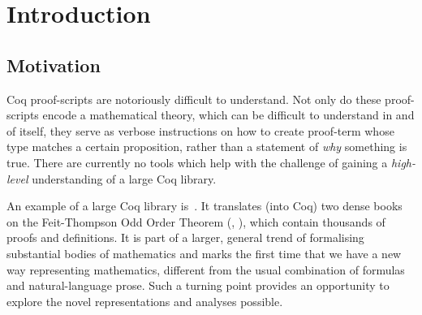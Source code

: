 \chapter{Introduction}\label{chap:intro}




\section{Motivation}

Coq proof-scripts are notoriously difficult to understand. Not only do these
proof-scripts encode a mathematical theory, which can be difficult to
understand in and of itself, they serve as verbose instructions on how to
create proof-term whose type matches a certain proposition, rather than a
statement of \emph{why} something is true. There are currently no tools which
help with the challenge of gaining a \emph{high-level} understanding of a large
Coq library.

An example of a large Coq library is~{\citealt{gonthier2013oot}}. It translates
(into Coq) two dense books on the Feit-Thompson Odd Order Theorem
(\citealt{peterfalvi2000oot}, \citealt{bender1994oot}), which contain
thousands of proofs and definitions. It is part of a larger, general trend of
formalising substantial bodies of mathematics and marks the first time that we
have a new way representing mathematics, different from the usual combination
of formulas and natural-language prose.  Such a turning point provides an
opportunity to explore the novel representations and analyses possible.

